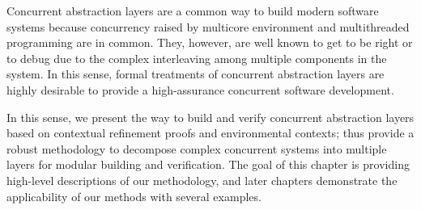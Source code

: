 Concurrent abstraction layers are a common way to build modern software systems because concurrency raised by multicore environment and multithreaded programming are in common.
They, however, are well known to get to be right or to debug due to the complex interleaving among multiple components in the system. 
In this sense, formal treatments of concurrent abstraction layers are highly desirable to provide a 
high-assurance concurrent software development. 

In this sense, we present the way to build and verify concurrent abstraction layers 
based on contextual refinement proofs and environmental contexts;
thus provide a robust methodology to decompose complex concurrent systems into multiple layers for modular building and verification.
The goal of this chapter is providing high-level descriptions of our methodology,
and later chapters demonstrate the applicability of our methods with several examples.